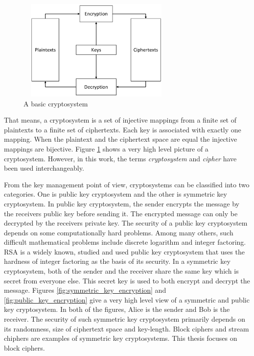 \begin{figure}[h!]
    \centering
    \includegraphics[width=0.7\textwidth , height = 5cm]{images/Cryptosystem}
    \caption{A basic cryptosystem}
    \label{fig:cryptosystem}
\end{figure}That means, a cryptosystem is a set of injective mappings from a finite set of plaintexts to a finite set of ciphertexts. Each key is associated with exactly one mapping. When the plaintext and the ciphertext space are equal the injective mappings are bijective. Figure \ref{fig:cryptosystem} shows a very high level picture of a cryptosystem. However, in this work, the terms \textit{cryptosystem} and \textit{cipher} have been used interchangeably. \par \noindent From the key management point of view, cryptosystems can be classified into two categories. One is public key cryptosystem and the other is symmetric key cryptosystem. In public key cryptosystem, the sender encrypts the message by the receiver\textquotesingle s public key before sending it. The encrypted message can only be decrypted by the receiver\textquotesingle s private key. The security of a public key cryptosystem depends on some computationally hard problems. Among many others, such difficult mathematical problems include discrete logarithm and integer factoring. RSA is a widely known, studied and used public key cryptosystem that uses the hardness of integer factoring as the basis of its security. In a symmetric key cryptosystem, both of the sender and the receiver share the same key which is secret from everyone else. This secret key is used to both encrypt and decrypt the message. Figures \ref{fig:symmetric_key_encryption} and \ref{fig:public_key_encryption} give a very high level view of a symmetric and public key cryptosystem. In both of the figures, Alice is the sender and Bob is the receiver. The security of such symmetric key cryptosystem primarily depends on its randomness, size of ciphertext space and key-length. Block ciphers and stream chiphers are examples of symmetric key cryptosystems. This thesis focuses on block ciphers.
